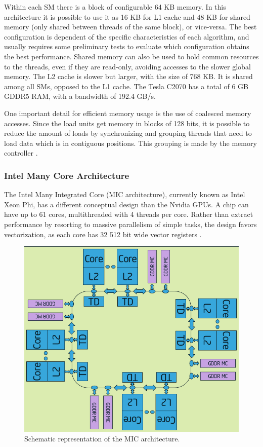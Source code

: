 Within each SM there is a block of configurable 64 KB memory. In this architecture it is possible to use it as 16 KB for L1 cache and 48 KB for shared memory (only shared between threads of the same block), or vice-versa. The best configuration is dependent of the specific characteristics of each algorithm, and usually requires some preliminary tests to evaluate which configuration obtains the best performance. Shared memory can also be used to hold common resources to the threads, even if they are read-only, avoiding accesses to the slower global memory. The L2 cache is slower but larger, with the size of 768 KB. It is shared among all SMs, opposed to the L1 cache. The Tesla C2070 has a total of 6 GB GDDR5 RAM, with a bandwidth of 192.4 GB/s.

One important detail for efficient memory usage is the use of coalesced memory accesses. Since the load units get memory in blocks of 128 bits, it is possible to reduce the amount of loads by synchronizing and grouping threads that need to load data which is in contiguous positions. This grouping is made by the memory controller .

\subsubsection*{Intel Many Core Architecture}
\label{MIC}

The Intel Many Integrated Core (MIC architecture), currently known as Intel Xeon Phi, has a different conceptual design than the Nvidia GPUs. A chip can have up to 61 cores, multithreaded with 4 threads per core. Rather than extract performance by resorting to massive parallelism of simple tasks, the design favors vectorization, as each core has 32 512 bit wide vector registers \cite{Intel:MIC}.

\begin{figure}[!htp]
	\begin{center}
		\includegraphics[scale=0.4]{../../common/img/mic_arch.png}
		\caption{Schematic representation of the \intel MIC architecture.}
		\label{fig:MICArchitecture}
	\end{center}
\end{figure}

